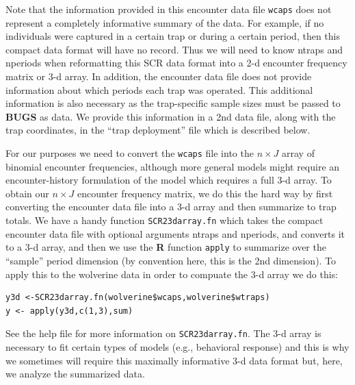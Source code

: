 Note that the information provided in this encounter data file
\mbox{\tt wcaps}
does not represent a completely informative summary
of the data. For example, if no individuals were captured in a certain
trap or during a certain period, then this compact data format will
have no record. Thus we will need to know ntraps and nperiods when
reformatting this SCR data format into a 2-d encounter frequency
matrix or 3-d array. In addition, the encounter data file does not
provide information about which periods each trap was operated. This
additional information is also necessary as the trap-specific sample
sizes must be passed to {\bf BUGS} as data. We provide this information in a
2nd data file, along with the trap coordinates, in the 
 ``trap deployment'' file which is described
below.

For our purposes we
need to convert the \mbox{\tt wcaps} file
into the $n \times J$ array of
binomial encounter frequencies, although more general models might
require an encounter-history formulation of the model which requires a
full 3-d array.  To obtain our $n \times J$ encounter frequency
matrix, we do this the hard way by first converting the encounter data
file into a 3-d array and then summarize to trap totals. We have a
handy function \mbox{\tt SCR23darray.fn} which takes the compact
encounter data file with optional arguments ntraps and nperiods, and
converts it to a 3-d array, and then we use the {\bf R} function
\mbox{\tt apply} to summarize over the ``sample'' period dimension (by
convention here, this is the 2nd dimension). To apply this to the
wolverine
data in order to compuate the 3-d array we do this:
{\small
\begin{verbatim}
y3d <-SCR23darray.fn(wolverine$wcaps,wolverine$wtraps)
y <- apply(y3d,c(1,3),sum)
\end{verbatim}
}
See the help file for more information on \mbox{\tt SCR23darray.fn}.
The 3-d array is necessary to fit certain types
of models (e.g., behavioral response) and this is why we sometimes
will require this maximally informative 3-d data format but, here, we
analyze the summarized data.



